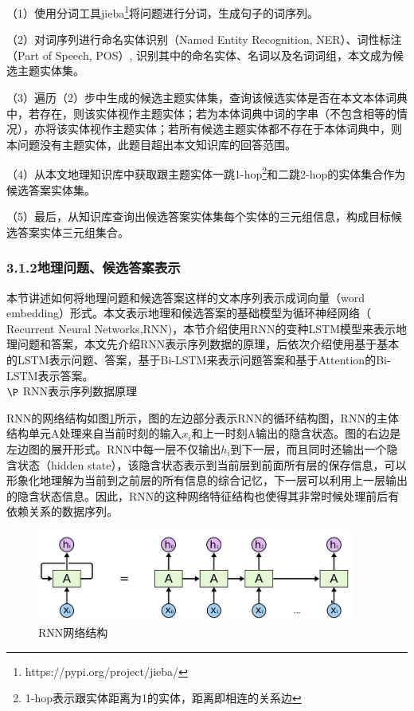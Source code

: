 （1）使用分词工具jieba\footnote{https://pypi.org/project/jieba/}将问题进行分词，生成句子的词序列。

（2）对词序列进行命名实体识别（Named Entity Recognition, NER）、词性标注（Part  of  Speech, POS）, 识别其中的命名实体、名词以及名词词组，本文成为候选主题实体集。

（3）遍历（2）步中生成的候选主题实体集，查询该候选实体是否在本文本体词典中，若存在，则该实体视作主题实体；若为本体词典中词的字串（不包含相等的情况），亦将该实体视作主题实体；若所有候选主题实体都不存在于本体词典中，则本问题没有主题实体，此题目超出本文知识库的回答范围。

（4）从本文地理知识库中获取跟主题实体一跳1-hop\footnote{1-hop表示跟实体距离为1的实体，距离即相连的关系边}和二跳2-hop的实体集合作为候选答案实体集。

（5）最后，从知识库查询出候选答案实体集每个实体的三元组信息，构成目标候选答案实体三元组集合。


\subsubsection{3.1.2\quad 地理问题、候选答案表示}
本节讲述如何将地理问题和候选答案这样的文本序列表示成词向量（word embedding）形式。本文表示地理和候选答案的基础模型为循环神经网络（ Recurrent Neural Networks,RNN)，本节介绍使用RNN的变种LSTM模型来表示地理问题和答案，本文先介绍RNN表示序列数据的原理，后依次介绍使用基于基本的LSTM表示问题、答案，基于Bi-LSTM来表示问题答案和基于Attention的Bi-LSTM表示答案。
\\

$\P$ RNN表示序列数据原理

RNN的网络结构如图\ref{fig:rnn_structure}所示，图的左边部分表示RNN的循环结构图，RNN的主体结构单元A处理来自当前时刻的输入$x_{i}$和上一时刻A输出的隐含状态。图的右边是左边图的展开形式。RNN中每一层不仅输出$h_{i}$到下一层，而且同时还输出一个隐含状态（hidden state），该隐含状态表示到当前层到前面所有层的保存信息，可以形象化地理解为当前到之前层的所有信息的综合记忆，下一层可以利用上一层输出的隐含状态信息。因此，RNN的这种网络特征结构也使得其非常时候处理前后有依赖关系的数据序列。

\begin{figure}[!htb]
	\centering\includegraphics[height=3cm]{resource/rnn_structure}
	\caption{RNN网络结构}
	\label{fig:rnn_structure}
\end{figure}

